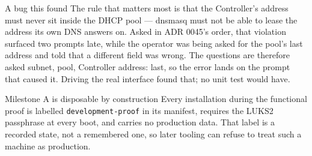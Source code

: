 \begin{telospanel}{A bug this found}
The rule that matters most is that the Controller's address must never sit
inside the DHCP pool --- dnsmasq must not be able to lease the address its own
DNS answers on. Asked in ADR 0045's order, that violation surfaced two prompts
late, while the operator was being asked for the pool's last address and told
that a different field was wrong. The questions are therefore asked subnet,
pool, Controller address: last, so the error lands on the prompt that caused it.
Driving the real interface found that; no unit test would have.
\end{telospanel}

\begin{gate}{Milestone A is disposable by construction}
Every installation during the functional proof is labelled
\texttt{development-proof} in its manifest, requires the LUKS2 passphrase at
every boot, and carries no production data. That label is a recorded state, not
a remembered one, so later tooling can refuse to treat such a machine as
production. 
\end{gate}


